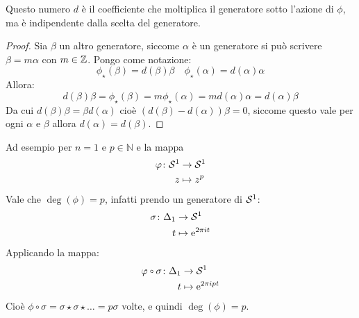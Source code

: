 \begin{osservation}
  Questo numero $ d $ è il coefficiente che moltiplica il generatore sotto
  l'azione di $ \phi $, ma è indipendente dalla scelta del generatore.
\end{osservation}
\begin{proof}
  Sia $ \beta $ un altro generatore, siccome $ \alpha $ è un generatore si può scrivere $ \beta = m \alpha $
  con $ m \in \mathbb{Z} $. Pongo come notazione:
  \[
    \phi_\star(\beta) = d(\beta) \beta \quad \phi_\star(\alpha) = d(\alpha) \alpha
  \]
  Allora:
  \[
    d(\beta) \beta = \phi_\star (\beta) = m \phi_\star (\alpha) = m d(\alpha) \alpha = d(\alpha) \beta
  \]
  Da cui $ d(\beta) \beta = \beta d(\alpha) $ cioè $ \left(d(\beta) - d(\alpha) \right) \beta = 0 $, siccome
  questo vale per ogni $ \alpha $ e $ \beta $ allora $ d(\alpha) = d(\beta) $.
\end{proof}

\begin{example}[$ n = 1 $]
  Ad esempio per $ n = 1 $ e $ p \in \mathbb{N} $ e la mappa
  \begin{align*}
    \varphi \colon  \mathcal{S}^{1} & \to  \mathcal{S}^{1} \\
    z   & \mapsto  z^p
  \end{align*}
  Vale che $ \deg{(\phi)} = p $, infatti prendo un generatore di $ \mathcal{S}^{1} $:
  \begin{align*}
    \sigma \colon \Delta_1 & \to \mathcal{S}^{1} \\
    t & \mapsto \mathrm{e}^{2 \pi i t}
  \end{align*}
  Applicando la mappa:
  \begin{align*}
    \phi \circ \sigma \colon \Delta_1 & \to \Sph{1} \\
    t & \mapsto \me^{2 \pi i p t}
  \end{align*}
  Cioè $ \phi \circ \sigma = \sigma \star \sigma \star \dots = p \sigma $ volte, e quindi $ \deg{(\phi)} = p $.
\end{example}

